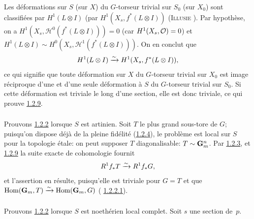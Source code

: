 \documentclass[10pt]{../fichiers-configuration-latex/smfart}
\begin{document}
Les déformations sur $S$ (\resp sur $X$) du $G$-torseur trivial sur
$S_{0}$ (\resp sur $X_{0}$) sont classifiées par $H^{1}(L\otimes I)$
(\resp par $H^{1}(X_{s},f^{\ast}(L\otimes I))$ (\textsc{Illusie}
\cite[VII~2.4.4~(ii)]{SGA4-18:3}).
Par hypothèse, on a $H^{1}(X_{s},ℋ^0(f^{\ast}(L\otimes
I)))=0$ (car $H^{1}(X_{s},{\mathcal O})=0$) et $H^{1}(L\otimes I)\sim
H^0(X_{s}, ℋ^{1}(f^{\ast}(L\otimes I)))$. On en conclut que
$$
H^{1}(L\otimes I)\xrightarrow{\sim} H^{1}(X_{s},f^{\ast}(L\otimes
I)){},
$$
ce qui signifie que toute déformation sur $X$ du $G$-torseur trivial
sur $X_{0}$ est image réciproque d'une et d'une seule déformation à
$S$ du $G$-torseur trivial sur $S_{0}$. Si cette déformation est
triviale le long d'une section, elle est donc triviale, ce qui prouve
\hyperref[XVIII.lem1.2.9]{1.2.9}.

\setcounter{subsubsection}{9}
\subsubsection{}
Prouvons \hyperref[XVIII.thm1.2.2]{1.2.2} lorsque $S$ est artinien. Soit $T$ le plus grand
sous-tore de $G$; puisqu'on dispose déjà de la pleine fidélité
(\hyperref[XVIII.lem1.2.4]{1.2.4}), le problème est local sur $S$ pour la
topologie étale: on 
peut supposer $T$ diagonalisable: $T\sim \mathbf{G}^{n}_{m}$. Par
\hyperref[XVIII.lem1.2.3]{1.2.3}, et \hyperref[XVIII.lem1.2.9]{1.2.9} la suite exacte de
cohomologie fournit 
$$
R^{1}f_{\ast}T\xrightarrow{\sim} R^{1}f_{\ast}G{},
$$
et l'assertion en résulte, puisqu'elle est triviale pour $G=T$ et que
$\operatorname{Hom}(\mathbf{G}_{m},T)\xrightarrow{\sim}\operatorname{Hom}(\mathbf{G}_{m},G)$ (\cf
\hyperref[XVIII.par1.2.2.1]{1.2.2.1}).

\subsubsection{}
Prouvons \hyperref[XVIII.thm1.2.2]{1.2.2} lorsque $S$ est noethérien local
complet. Soit $s$ une section de~$p$.
\end{document}

